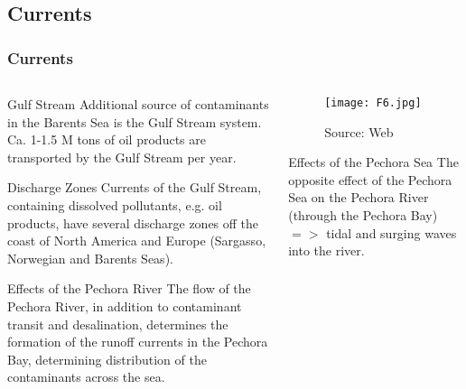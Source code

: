 \documentclass[pdflatex,compress,8pt,
	xcolor={dvipsnames,dvipsnames,svgnames,x11names,table},
	hyperref={	
	breaklinks = true, 
	pdfauthor={Lemenkova Polina}, 
	pdfsubject={Presentation}, 
	pdfcreator={Lemenkova Polina}, 
	pdfproducer={Lemenkova Polina}, 
	colorlinks=true,
	linkcolor=NavyBlue, 
	citecolor=NavyBlue, 
	urlcolor = NavyBlue, 
	breaklinks = true}]{beamer}
\begin{document}
\subsection{Currents}
\begin{frame}\frametitle{Currents}

\begin{minipage}[0.4\textheight]{\textwidth}
\begin{columns}[T]
\begin{column}{0.5\textwidth}
\begin{alertblock}{Gulf Stream}
Additional source of contaminants in the Barents Sea is the Gulf Stream system. Ca. 1-1.5 M tons of oil products are transported by the Gulf Stream per year. 
\end{alertblock}

\begin{block}{Discharge Zones}
Currents of the Gulf Stream, containing dissolved pollutants, e.g. oil products, have several discharge zones off the coast of North America and Europe (Sargasso, Norwegian and Barents Seas).
\end{block}

\begin{block}{Effects of the Pechora River}
The flow of the Pechora River, in addition to contaminant transit and desalination, determines the formation of the runoff currents in the Pechora Bay, determining distribution of the contaminants across the sea. 
\end{block}

\end{column}
\begin{column}{0.5\textwidth}
\vspace{2em} 
\begin{figure}[H]
	\centering
		\texttt{[image: F6.jpg]}\caption{Source: Web}
\end{figure}

\begin{block}{Effects of the Pechora Sea}
The opposite effect of the Pechora Sea on the Pechora River (through the Pechora Bay) $=>$ tidal and surging waves into the river.
\end{block}

\end{column}
\end{columns}
\end{minipage}

\end{frame}
\end{document}
